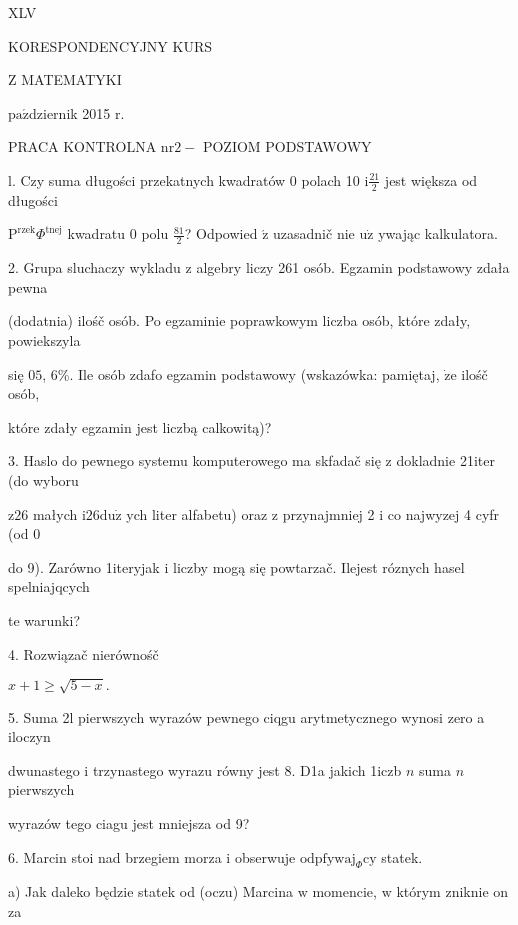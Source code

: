 \documentclass[a4paper,12pt]{article}
\begin{document}
XLV

KORESPONDENCYJNY KURS

Z MATEMATYKI

$\mathrm{p}\mathrm{a}\acute{\mathrm{z}}$dziernik 2015 $\mathrm{r}.$

PRACA KONTROLNA $\mathrm{n}\mathrm{r} 2-$ POZIOM PODSTAWOWY

l. Czy suma długości przekatnych kwadratów $0$ polach 10 $\mathrm{i} \displaystyle \frac{21}{2}$ jest większa od długości

$\mathrm{P}^{\mathrm{r}\mathrm{z}\mathrm{e}\mathrm{k}}\Phi^{\mathrm{t}\mathrm{n}\mathrm{e}\mathrm{j}}$ kwadratu $0$ polu $\displaystyle \frac{81}{2}$? Odpowied $\acute{\mathrm{z}}$ uzasadnič nie $\mathrm{u}\dot{\mathrm{z}}$ ywając kalkulatora.

2. Grupa sluchaczy wykladu $\mathrm{z}$ algebry liczy 261 osób. Egzamin podstawowy zdała pewna

(dodatnia) ilośč osób. Po egzaminie poprawkowym liczba osób, które zdały, powiekszyla

się $0 5$, 6\%. Ile osób zdafo egzamin podstawowy (wskazówka: pamiętaj, $\dot{\mathrm{z}}\mathrm{e}$ ilośč osób,

które zdały egzamin jest liczbą calkowitą)?

3. Haslo do pewnego systemu komputerowego ma skfadač się $\mathrm{z}$ dokladnie 21iter (do wyboru

$\mathrm{z}26$ małych $\mathrm{i}26\mathrm{d}\mathrm{u}\dot{\mathrm{z}}$ ych liter alfabetu) oraz $\mathrm{z}$ przynajmniej 2 $\mathrm{i}$ co najwyzej 4 cyfr (od 0

do 9). Zarówno 1iteryjak $\mathrm{i}$ liczby mogą się powtarzač. Ilejest róznych hasel spelniajqcych

te warunki?

4. Rozwiązač nierównośč

$x+1\geq\sqrt{5-x}.$

5. Suma 2l pierwszych wyrazów pewnego ciqgu arytmetycznego wynosi zero a iloczyn

dwunastego $\mathrm{i}$ trzynastego wyrazu równy jest 8. D1a jakich 1iczb $n$ suma $n$ pierwszych

wyrazów tego ciagu jest mniejsza od 9?

6. Marcin stoi nad brzegiem morza $\mathrm{i}$ obserwuje $\mathrm{o}\mathrm{d}\mathrm{p}\mathrm{f}\mathrm{y}\mathrm{w}\mathrm{a}\mathrm{j}_{\Phi}\mathrm{c}\mathrm{y}$ statek.

a) Jak daleko będzie statek od (oczu) Marcina $\mathrm{w}$ momencie, $\mathrm{w}$ którym zniknie on za
\end{document}
